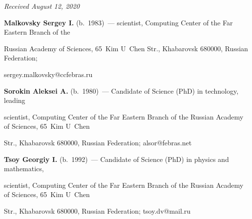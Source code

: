\vspace*{-3pt}





\hfill{\small\textit{Received August 12, 2020}} 





\vspace*{-6pt}


 


 \Contr


 




 


\noindent


\textbf{Malkovsky Sergey I.} (b.\ 1983)~--- scientist, Computing Center of the Far Eastern Branch of the 


Russian Academy of Sciences, 65~Kim U~Chen Str., Khabarovsk 680000, Russian Federation; 


\mbox{sergey.malkovsky@ccfebras.ru}





\vspace*{3pt}





\noindent


\textbf{Sorokin Aleksei A.} (b.\ 1980)~--- Candidate of Science (PhD) in technology, leading 


scientist, Computing Center of the Far Eastern Branch of the Russian Academy of Sciences, 65~Kim U~Chen 


Str., Khabarovsk 680000, Russian Federation; \mbox{alsor@febras.net}





\vspace*{3pt}





\noindent


\textbf{Tsoy Georgiy I.} (b.\ 1992)~--- Candidate of Science (PhD) in physics and mathematics, 


scientist, Computing Center of the Far Eastern Branch of the Russian Academy of Sciences, 65~Kim U~Chen 


Str., Khabarovsk 680000, Russian Federation; \mbox{tsoy.dv@mail.ru}





